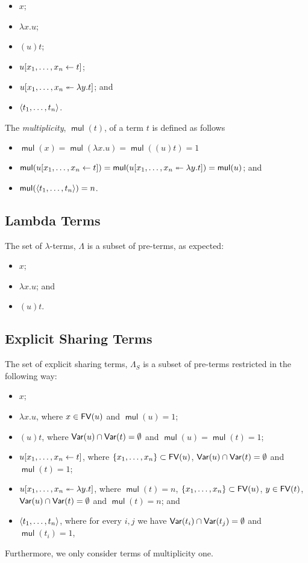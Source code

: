 \documentclass[11pt,a4paper]{article}
\theoremstyle{definition}
\theoremstyle{plain}
\theoremstyle{remark}
\begin{document}
\newcommand{\mul}{{\mathop{\mathsf{mul}}}}

\begin{itemize}
	\item $x$;
	\item $\lambda x.u$;
	\item $(u)t$;
	\item ${ { {u}[{{x_1},\dots,{x_n}}\leftarrow{t}] } }$;
	\item ${ { {u}[{{x_1},\dots,{x_n}}\twoheadleftarrow{\lambda{y}.{t}}] } }$; and
	\item ${ {\langle} {t_1},\dots,{t_n} {\rangle} }$.
\end{itemize}

The \emph{multiplicity}, $\mul(t)$, of a term $t$ is defined as follows

\begin{itemize}
	\item $\mul(x)=\mul(\lambda x.u)=\mul((u)t)=1$
	\item $\mul(\tershare{u}{x_1}{x_n}{t})=\mul(\terdist{u}{x_1}{x_n}{y}{t})=\mul(u)$; and
	\item $\mul(\tertuple{t_1}{t_n})=n$.
\end{itemize}

\subsection{Lambda Terms}

The set of $\lambda$-terms, $\Lambda$ is a subset of pre-terms, as expected:

\begin{itemize}
	\item $x$;
	\item $\lambda x.u$; and
	\item $(u)t$.
\end{itemize}

\subsection{Explicit Sharing Terms}

The set of explicit sharing terms, $\Lambda_S$ is a subset of pre-terms restricted in the following way:

\begin{itemize}
	\item $x$;
	\item $\lambda x.u$, where $x\in{\mathop{\mathsf{FV}}}(u)$ and $\mul(u)=1$;
	\item $(u)t$, where ${\mathop{\mathsf{Var}}}(u)\cap{\mathop{\mathsf{Var}}}(t)=\emptyset$ and $\mul(u)=\mul(t)=1$;
	\item ${ { {u}[{{x_1},\dots,{x_n}}\leftarrow{t}] } }$, where $\{x_1,\dots,x_n\}\subset{\mathop{\mathsf{FV}}}(u)$, ${\mathop{\mathsf{Var}}}(u)\cap{\mathop{\mathsf{Var}}}(t)=\emptyset$ and $\mul(t)=1$;
	\item ${ { {u}[{{x_1},\dots,{x_n}}\twoheadleftarrow{\lambda{y}.{t}}] } }$, where $\mul(t)=n$, $\{x_1,\dots,x_n\}\subset{\mathop{\mathsf{FV}}}(u)$, $y\in{\mathop{\mathsf{FV}}}(t)$, ${\mathop{\mathsf{Var}}}(u)\cap{\mathop{\mathsf{Var}}}(t)=\emptyset$ and $\mul(t)=n$; and
	\item ${ {\langle} {t_1},\dots,{t_n} {\rangle} }$, where for every $i,j$ we have ${\mathop{\mathsf{Var}}}(t_i)\cap{\mathop{\mathsf{Var}}}(t_j)=\emptyset$ and $\mul(t_i)=1$,
\end{itemize}
Furthermore, we only consider terms of multiplicity one.
\end{document}
